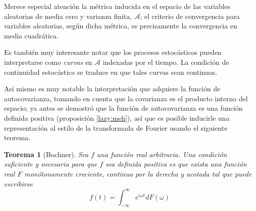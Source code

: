 \documentclass[12pt,letterpaper]{book}
\newtheorem{teorema}{Teorema}[chapter]
\newcommand{\R}{\mathbb{R}}
\newcommand{\C}{\mathbb{C}}
\newcommand{\intR}{\int_{-\infty}^{\infty}}
\newcommand{\abso}[1]{\left| #1 \right|}
\begin{document}
Merece especial atención la métrica inducida en el espacio de las variables aleatorias de media cero y varianza finita, $\mathcal{A}$; el criterio de convergencia para variables aleatorias, según dicha métrica, es precisamente la convergencia en media cuadrática.

Es también muy interesante notar que los procesos estocásticos pueden interpretarse como \textit{curvas} en $\mathcal{A}$ indexadas por el tiempo.
%
La condición de continuidad estocástica se traduce en que tales curvas sean continuas.

Así mismo es muy notable la interpretación que adquiere la función de autocovarianza, tomando en cuenta que la covarianza es el producto interno del espacio;
%
ya antes se demostró que la función de autocovarianza es una función definida positiva (proposición \ref{lazy:meh}), así que es posible inducirle una representación al estilo de la transformada de Fourier usando el siguiente teorema.

\begin{teorema}[Bochner]
Sea $f$ una función real arbitraria. Una condición suficiente y necesaria para que $f$ sea definida positiva es que exista una función real $F$ monótonamente creciente, continua por la derecha y acotada tal que puede escribirse
\begin{equation}
f(t) = \intR e^{i \omega t} dF(\omega)
\end{equation}
\end{teorema}

\end{document}
